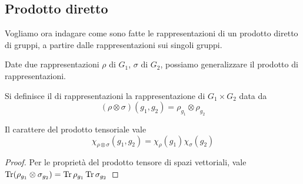 \documentclass[a4paper,10pt,oneside]{math_article}
\newcommand{\tensor}{\otimes}
\begin{document}
  
  \subsection{Prodotto diretto}
   
   Vogliamo ora indagare come sono fatte le rappresentazioni di un prodotto diretto di gruppi, a partire dalle rappresentazioni sui singoli gruppi.
   
   Date due rappresentazioni $\rho$ di $G_1$, $\sigma$ di $G_2$, possiamo generalizzare il prodotto di rappresentazioni.
   \begin{mydef}
    Si definisce il  di rappresentazioni la rappresentazione di $G_1\times G_2$ data da
    \[
     (\rho \tensor \sigma)(g_1,g_2) = \rho_{g_1} \tensor \rho_{g_2} 
    \]
   \end{mydef}

   \begin{myprop}
    Il carattere del prodotto tensoriale vale
    \[
     \chi_{\rho\tensor\sigma}(g_1,g_2) = \chi_\rho(g_1)\chi_\sigma(g_2)
    \] 
   \end{myprop}

   \begin{proof}
    Per le proprietà del prodotto tensore di spazi vettoriali, vale $\Tr(\rho_{g_1}\tensor \sigma_{g_2})= \Tr{\rho_{g_1}}\Tr{\sigma_{g_2}}$
   \end{proof}
   
\end{document}
